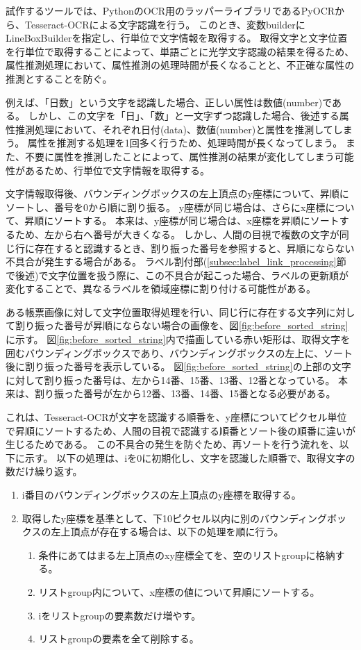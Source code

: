 試作するツールでは、PythonのOCR用のラッパーライブラリであるPyOCR\cite{PyOCR}から、Tesseract-OCRによる文字認識を行う。
このとき、変数builderにLineBoxBuilderを指定し、行単位で文字情報を取得する。
取得文字と文字位置を行単位で取得することによって、単語ごとに光学文字認識の結果を得るため、属性推測処理において、属性推測の処理時間が長くなることと、不正確な属性の推測とすることを防ぐ。

例えば、「日数」という文字を認識した場合、正しい属性は数値(number)である。
しかし、この文字を「日」、「数」と一文字ずつ認識した場合、後述する属性推測処理において、それぞれ日付(data)、数値(number)と属性を推測してしまう。
属性を推測する処理を1回多く行うため、処理時間が長くなってしまう。
また、不要に属性を推測したことによって、属性推測の結果が変化してしまう可能性があるため、行単位で文字情報を取得する。

文字情報取得後、バウンディングボックスの左上頂点のy座標について、昇順にソートし、番号を0から順に割り振る。
y座標が同じ場合は、さらにx座標について、昇順にソートする。
本来は、y座標が同じ場合は、x座標を昇順にソートするため、左から右へ番号が大きくなる。
しかし、人間の目視で複数の文字が同じ行に存在すると認識するとき、割り振った番号を参照すると、昇順にならない不具合が発生する場合がある。
ラベル割付部(\ref{subsec:label_link_processing}節で後述)で文字位置を扱う際に、この不具合が起こった場合、ラベルの更新順が変化することで、異なるラベルを領域座標に割り付ける可能性がある。

ある帳票画像に対して文字位置取得処理を行い、同じ行に存在する文字列に対して割り振った番号が昇順にならない場合の画像を、図\ref{fig:before_sorted_string}に示す。
図\ref{fig:before_sorted_string}内で描画している赤い矩形は、取得文字を囲むバウンディングボックスであり、バウンディングボックスの左上に、ソート後に割り振った番号を表示している。
図\ref{fig:before_sorted_string}の上部の文字に対して割り振った番号は、左から14番、15番、13番、12番となっている。
本来は、割り振った番号が左から12番、13番、14番、15番となる必要がある。

これは、Tesseract-OCRが文字を認識する順番を、y座標についてピクセル単位で昇順にソートするため、人間の目視で認識する順番とソート後の順番に違いが生じるためである。
この不具合の発生を防ぐため、再ソートを行う流れを、以下に示す。
以下の処理は、iを0に初期化し、文字を認識した順番で、取得文字の数だけ繰り返す。

\begin{enumerate}
    \item i番目のバウンディングボックスの左上頂点のy座標を取得する。
    \item 取得したy座標を基準として、下10ピクセル以内に別のバウンディングボックスの左上頂点が存在する場合は、以下の処理を順に行う。
    \begin{enumerate}
        \item 条件にあてはまる左上頂点のxy座標全てを、空のリストgroupに格納する。
        \item リストgroup内について、x座標の値について昇順にソートする。
        \item iをリストgroupの要素数だけ増やす。
        \item リストgroupの要素を全て削除する。
    \end{enumerate}
\end{enumerate}

